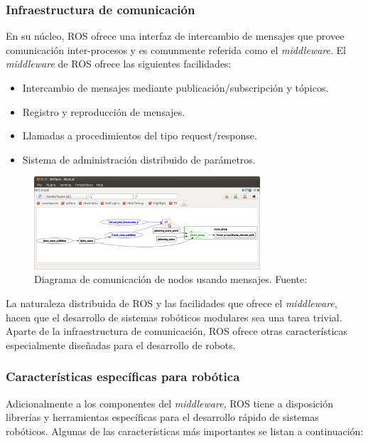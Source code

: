         \subsubsection{Infraestructura de comunicación}
        En su núcleo, ROS ofrece una interfaz de intercambio de mensajes que provee comunicación inter-procesos y es 
        comunmente referida como el \textit{middleware}. El \textit{middleware} de ROS ofrece las siguientes facilidades:

        \begin{itemize}
            \item Intercambio de mensajes mediante publicación/subscripción y tópicos.
            \item Registro y reproducción de mensajes.
            \item Llamadas a procedimientos del tipo request/response.
            \item Sistema de administración distribuido de parámetros.
        \end{itemize}

        \begin{figure}[!h] 
            \centering
            \includegraphics[width=0.75\textwidth]{img/rqtgraph}
            \caption[Diagrama de comunicación de nodos]{Diagrama de comunicación de nodos usando mensajes. Fuente: \cite{roswiki} }
            \label{fig:rqtgraph}
        \end{figure}

        La naturaleza distribuida de ROS y las facilidades que ofrece el \textit{middleware}, hacen que el desarrollo de sistemas 
        robóticos modulares sea una tarea trivial. Aparte de la infraestructura de comunicación, ROS ofrece otras características
        especialmente diseñadas para el desarrollo de robots.
        
        \subsubsection{Características específicas para robótica}
        Adicionalmente a los componentes del \textit{middleware}, ROS tiene a disposición librerías y herramientas específicas 
        para el desarrollo rápido de sistemas robóticos. Algunas de las características más importantes se listan a continuación:

